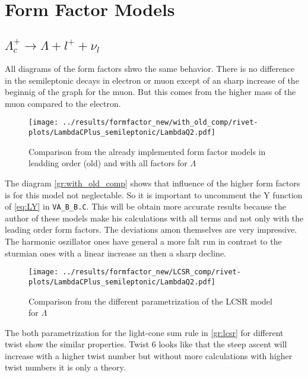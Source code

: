 \clearpage
\section{Form Factor Models}
\subsection{\(\Lambda_c^+ \rightarrow \Lambda + l^+ + \nu_l\)}
All diagrams of the form factors shwo the same behavior. There is no difference 
in the semileptonic decays in electron or muon except of an sharp increase of 
the beginnig of the graph for the muon. But this comes from the higher 
mass of the muon compared to the electron.

\begin{figure}[h]
  \centering
  \texttt{[image: ../results/formfactor\_new/with\_old\_comp/rivet-plots/LambdaCPlus\_semileptonic/LambdaQ2.pdf]}
  \caption{Comparison from the already implemented form factor models in leadding order (old)
  and with all factors for \(\Lambda\)} \label{gr:with_old_comp}
\end{figure}

The diagram {\eqref{gr:with_old_comp}} shows that influence of the higher form 
factors is for this model not neglectable. So it is important to uncomment 
the Y function of {\eqref{eq:LY}} in \texttt{VA\_B\_B.C}. This will be obtain 
more accurate results because the author of these models make his calculations 
with all terms and not only with the leading order form factors. The deviations 
amon themselves are very impressive. The harmonic oszillator ones have general 
a more falt run in contrast to the sturmian ones with a linear increase an then 
a sharp decline.

\begin{figure}[h]
  \centering
  \texttt{[image: ../results/formfactor\_new/LCSR\_comp/rivet-plots/LambdaCPlus\_semileptonic/LambdaQ2.pdf]}
  \caption{Comparison from the different parametrization of the LCSR model for \(\Lambda\)} \label{gr:lcsr}
\end{figure}
The both parametrization for the light-cone sum rule in {\eqref{gr:lcsr}} for 
different twist show the similar properties. Twist 6 looks like that the steep 
ascent will increase with a higher twist number but without more calculations 
with higher twist numbers it is only a theory.

